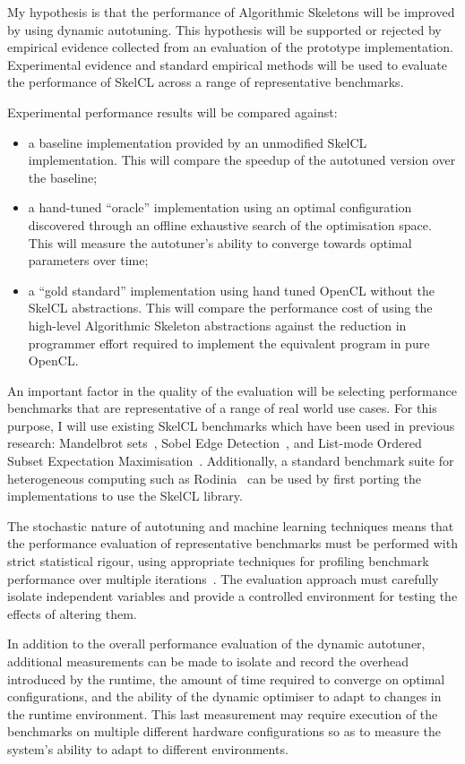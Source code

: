 My hypothesis is that the performance of Algorithmic Skeletons will be
improved by using dynamic autotuning. This hypothesis will be
supported or rejected by empirical evidence collected from an
evaluation of the prototype implementation. Experimental evidence and
standard empirical methods will be used to evaluate the performance of
SkelCL across a range of representative benchmarks.

Experimental performance results will be compared against:

\begin{itemize}
\item a baseline implementation provided by an unmodified SkelCL
implementation. This will compare the speedup of the autotuned version
over the baseline;
\item a hand-tuned ``oracle'' implementation using an optimal
configuration discovered through an offline exhaustive search of the
optimisation space. This will measure the autotuner's ability to
converge towards optimal parameters over time;
\item a ``gold standard'' implementation using hand tuned OpenCL
without the SkelCL abstractions. This will compare the performance
cost of using the high-level Algorithmic Skeleton abstractions against
the reduction in programmer effort required to implement the
equivalent program in pure OpenCL.
\end{itemize}

An important factor in the quality of the evaluation will be selecting
performance benchmarks that are representative of a range of real
world use cases. For this purpose, I will use existing SkelCL
benchmarks which have been used in previous research: Mandelbrot
sets~\cite{Steuwer2011}, Sobel Edge Detection~\cite{Steuwer2013a}, and
List-mode Ordered Subset Expectation
Maximisation~\cite{Steuwer2013}. Additionally, a standard benchmark
suite for heterogeneous computing such as Rodinia~\cite{Che2009} can
be used by first porting the implementations to use the SkelCL
library.


The stochastic nature of autotuning and machine learning techniques
means that the performance evaluation of representative benchmarks
must be performed with strict statistical rigour, using appropriate
techniques for profiling benchmark performance over multiple
iterations~\cite{Georges2007}. The evaluation approach must carefully
isolate independent variables and provide a controlled environment for
testing the effects of altering them.

In addition to the overall performance evaluation of the dynamic
autotuner, additional measurements can be made to isolate and record
the overhead introduced by the runtime, the amount of time required to
converge on optimal configurations, and the ability of the dynamic
optimiser to adapt to changes in the runtime environment. This last
measurement may require execution of the benchmarks on multiple
different hardware configurations so as to measure the system's
ability to adapt to different environments.
